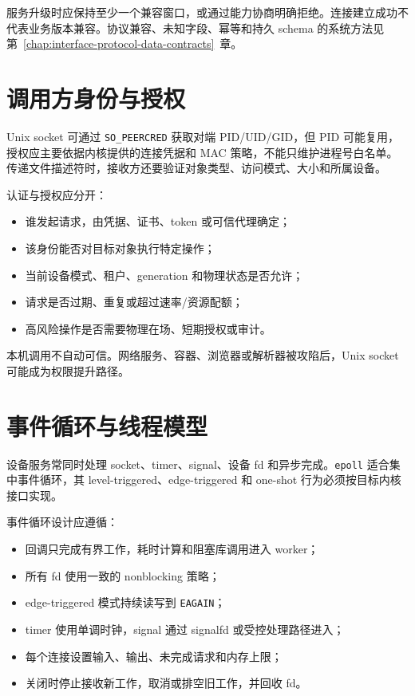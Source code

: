 服务升级时应保持至少一个兼容窗口，或通过能力协商明确拒绝。连接建立成功不代表业务版本兼容。协议兼容、未知字段、幂等和持久 schema 的系统方法见第~\ref{chap:interface-protocol-data-contracts}~章。

\section{调用方身份与授权}

Unix socket 可通过 \texttt{SO\_PEERCRED} 获取对端 PID/UID/GID，但 PID 可能复用，授权应主要依据内核提供的连接凭据和 MAC 策略，不能只维护进程号白名单。传递文件描述符时，接收方还要验证对象类型、访问模式、大小和所属设备。

认证与授权应分开：

\begin{itemize}
  \item 谁发起请求，由凭据、证书、token 或可信代理确定；
  \item 该身份能否对目标对象执行特定操作；
  \item 当前设备模式、租户、generation 和物理状态是否允许；
  \item 请求是否过期、重复或超过速率/资源配额；
  \item 高风险操作是否需要物理在场、短期授权或审计。
\end{itemize}

本机调用不自动可信。网络服务、容器、浏览器或解析器被攻陷后，Unix socket 可能成为权限提升路径。

\section{事件循环与线程模型}

设备服务常同时处理 socket、timer、signal、设备 fd 和异步完成。\texttt{epoll} 适合集中事件循环，其 level-triggered、edge-triggered 和 one-shot 行为必须按目标内核接口实现\cite{linux-epoll-man}。

事件循环设计应遵循：

\begin{itemize}
  \item 回调只完成有界工作，耗时计算和阻塞库调用进入 worker；
  \item 所有 fd 使用一致的 nonblocking 策略；
  \item edge-triggered 模式持续读写到 \texttt{EAGAIN}；
  \item timer 使用单调时钟，signal 通过 signalfd 或受控处理路径进入；
  \item 每个连接设置输入、输出、未完成请求和内存上限；
  \item 关闭时停止接收新工作，取消或排空旧工作，并回收 fd。
\end{itemize}

